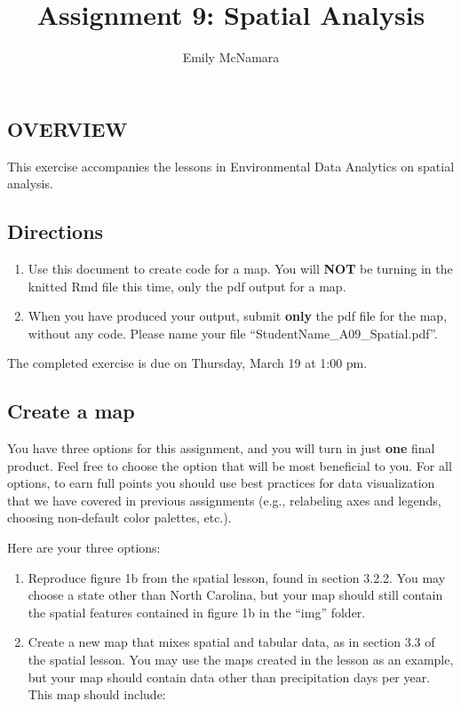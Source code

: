 \documentclass[]{article}
\title{Assignment 9: Spatial Analysis}
\author{Emily McNamara}
\date{}
\providecommand{\tightlist}{%
  \setlength{\itemsep}{0pt}\setlength{\parskip}{0pt}}
\begin{document}
\maketitle

\subsection{OVERVIEW}\label{overview}

This exercise accompanies the lessons in Environmental Data Analytics on
spatial analysis.

\subsection{Directions}\label{directions}

\begin{enumerate}
\def\labelenumi{\arabic{enumi}.}
\tightlist
\item
  Use this document to create code for a map. You will \textbf{NOT} be
  turning in the knitted Rmd file this time, only the pdf output for a
  map.
\item
  When you have produced your output, submit \textbf{only} the pdf file
  for the map, without any code. Please name your file
  ``StudentName\_A09\_Spatial.pdf''.
\end{enumerate}

The completed exercise is due on Thursday, March 19 at 1:00 pm.

\subsection{Create a map}\label{create-a-map}

You have three options for this assignment, and you will turn in just
\textbf{one} final product. Feel free to choose the option that will be
most beneficial to you. For all options, to earn full points you should
use best practices for data visualization that we have covered in
previous assignments (e.g., relabeling axes and legends, choosing
non-default color palettes, etc.).

Here are your three options:

\begin{enumerate}
\def\labelenumi{\arabic{enumi}.}
\item
  Reproduce figure 1b from the spatial lesson, found in section 3.2.2.
  You may choose a state other than North Carolina, but your map should
  still contain the spatial features contained in figure 1b in the
  ``img'' folder.
\item
  Create a new map that mixes spatial and tabular data, as in section
  3.3 of the spatial lesson. You may use the maps created in the lesson
  as an example, but your map should contain data other than
  precipitation days per year. This map should include:
\end{enumerate}
\end{document}
